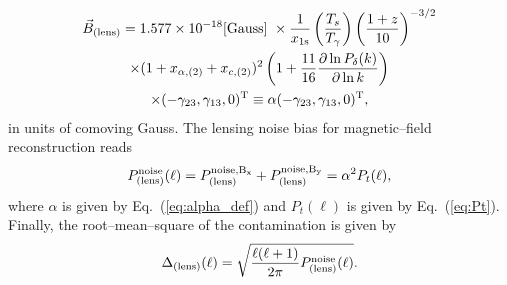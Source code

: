 \documentclass[aps,prd,twocolumn,floatfix,showpacs,superscriptaddress,nofootinbib]{revtex4-1}
\newcommand{\beq}{\begin{equation}}
\newcommand{\eeq}{\end{equation}}
\newcommand{\bga}{\begin{gathered}}
\newcommand{\ega}{\end{gathered}}
\begin{document}
\beq
\bga
{\vec{B}}_{\rm (lens)}=1.577\times 10^{-18}{\left[\rm Gauss\right]}\ \times \frac{1}{x_{\rm 1s}}\left(\frac{T_s}{T_{\gamma}}\right)\left(\frac{1+z}{10}\right)^{-3/2}\\
\times(1+x_{\alpha,(2)}+x_{c,(2)})^2\left(1+\frac{11}{16}\frac{\partial\ln P_\delta(k)}{\partial\ln k}\right)\\
\times(-\gamma_{23},\gamma_{13},0)^{\rm T}
\equiv\alpha(-\gamma_{23},\gamma_{13},0)^{\rm T},
\label{eq:alpha_def}
\ega
\eeq
in units of comoving Gauss. The lensing noise bias for magnetic--field reconstruction reads
\beq
P_{(\text{lens})}^{\rm noise}(\ell)=P_{(\text{lens})}^{\rm noise, B_x}+P_{(\text{lens})}^{\rm noise, B_y}=\alpha^2 P_t(\ell),
\eeq
where $\alpha$ is given by Eq.~(\ref{eq:alpha_def}) and $P_t(\ell)$ is given by Eq.~(\ref{eq:Pt}). Finally, the root--mean--square of the contamination is given by
\beq
\Delta_{(\text{lens})}(\ell)=\sqrt{\frac{\ell(\ell+1)}{2\pi}P_{(\text{lens})}^{\rm noise}(\ell)}.
\label{eq:delta_lens}
\eeq
\end{document}
